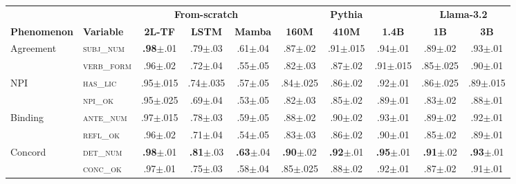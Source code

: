 \documentclass[11pt]{article}
\newcommand{\spm}[1]{{\scriptsize$\pm$#1}}
\begin{document}
\begin{table}[t]
\centering\small
\setlength{\tabcolsep}{3.2pt}
\begin{tabular}{@{}ll ccc ccc cc@{}}
\toprule
& & \multicolumn{3}{c}{\textbf{From-scratch}} & \multicolumn{3}{c}{\textbf{Pythia}} & \multicolumn{2}{c}{\textbf{Llama-3.2}} \\
\cmidrule(lr){3-5}\cmidrule(lr){6-8}\cmidrule(lr){9-10}
\textbf{Phenomenon} & \textbf{Variable} & \textbf{2L-TF} & \textbf{LSTM} & \textbf{Mamba} & \textbf{160M} & \textbf{410M} & \textbf{1.4B} & \textbf{1B} & \textbf{3B} \\
\midrule
\multirow{2}{*}{Agreement}
  & \textsc{subj\_num}  & \cellcolor{cellbest}\textbf{.98}\spm{.01} & .79\spm{.03} & .61\spm{.04} & .87\spm{.02} & .91\spm{.015} & .94\spm{.01} & .89\spm{.02} & .93\spm{.01} \\
  & \textsc{verb\_form} & .96\spm{.02} & .72\spm{.04} & \cellcolor{cellweak}.55\spm{.05} & .82\spm{.03} & .87\spm{.02} & .91\spm{.015} & .85\spm{.025} & .90\spm{.01} \\[2pt]
\multirow{2}{*}{NPI}
  & \textsc{has\_lic}   & .95\spm{.015} & .74\spm{.035} & .57\spm{.05} & .84\spm{.025} & .86\spm{.02} & .92\spm{.01} & .86\spm{.025} & .89\spm{.015} \\
  & \textsc{npi\_ok}    & .95\spm{.025} & .69\spm{.04} & \cellcolor{cellweak}.53\spm{.05} & .82\spm{.03} & .85\spm{.02} & .89\spm{.01} & .83\spm{.02} & .88\spm{.01} \\[2pt]
\multirow{2}{*}{Binding}
  & \textsc{ante\_num}  & .97\spm{.015} & .78\spm{.03} & .59\spm{.05} & .88\spm{.02} & .90\spm{.02} & .93\spm{.01} & .89\spm{.02} & .92\spm{.01} \\
  & \textsc{refl\_ok}   & .96\spm{.02} & .71\spm{.04} & \cellcolor{cellweak}.54\spm{.05} & .83\spm{.03} & .86\spm{.02} & .90\spm{.01} & .85\spm{.02} & .89\spm{.01} \\[2pt]
\multirow{2}{*}{Concord}
  & \textsc{det\_num}   & \cellcolor{cellbest}\textbf{.98}\spm{.01} & \cellcolor{cellbest}\textbf{.81}\spm{.03} & \cellcolor{cellbest}\textbf{.63}\spm{.04} & \cellcolor{cellbest}\textbf{.90}\spm{.02} & \cellcolor{cellbest}\textbf{.92}\spm{.01} & \cellcolor{cellbest}\textbf{.95}\spm{.01} & \cellcolor{cellbest}\textbf{.91}\spm{.02} & \cellcolor{cellbest}\textbf{.93}\spm{.01} \\
  & \textsc{conc\_ok}   & .97\spm{.01} & .75\spm{.03} & \cellcolor{cellweak}.58\spm{.04} & .85\spm{.025} & .88\spm{.02} & .92\spm{.01} & .87\spm{.02} & .91\spm{.01} \\
\midrule

\end{tabular}
\end{table}
\end{document}
